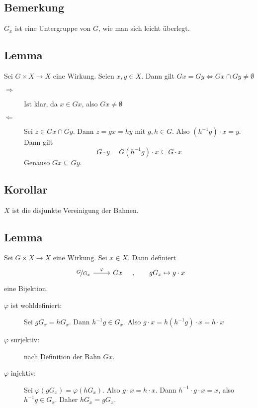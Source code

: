 \subsection[Bemerkung: $G_x$ ist eine Untergruppe von $G$]{Bemerkung} %
\label{sub:36}
$G_x$ ist eine Untergruppe von $G$, wie man sich leicht überlegt.

\subsection[Lemma über die Gleichheit von Bahnen]{Lemma} %
\label{sub:37}
Sei $G \times X \to X$ eine Wirkung. Seien $x,y \in X$. Dann gilt $Gx= Gy \Longleftrightarrow Gx \cap Gy \not= \emptyset$
\begin{description}
	\item[\glqq$\Rightarrow $\grqq] Ist klar, da $x \in Gx$, also $Gx \not= \emptyset$
	\item[\glqq$\Leftarrow$\grqq] Sei $z \in Gx \cap Gy$. Dann $z= gx= hy$ mit $g,h \in G$. Also $(h ^{-1} g) \cdot x = y$. Dann gilt
	\[
		G \cdot y = G (h ^{-1} g) \cdot x \subseteq G \cdot x
	\]
	Genauso $Gx \subseteq Gy$. \bewende
\end{description}

\subsection[Korollar: $X$ ist die disjunkte Vereinigung der Bahnen]{Korollar} %
\label{sub:38}
$X$ ist die disjunkte Vereinigung der Bahnen.

\subsection[Lemma: Bijektion $\nicefrac{G}{G_x} \to Gx$]{Lemma} %
\label{sub:39}
Sei $G \times X \to X$ eine Wirkung. Sei $x \in X$. Dann definiert 
\[
	\begin{tikzcd}
		\nicefrac{G}{G_x} \rar{\varphi} & Gx
	\end{tikzcd} \quad , \qquad  g G_x \mapsto g \cdot x
\]
eine Bijektion.
\begin{description}
	\item[$\varphi$ ist wohldefiniert:] Sei $gG_x = hG_x$. Dann $h ^{-1} g \in G_x$. Also $g \cdot x = h (h ^{-1} g) \cdot x = h \cdot x$
	\item[$\varphi$ surjektiv:] nach Definition der Bahn $Gx$.
	\item[$\varphi$ injektiv:] Sei $\varphi(gG_x) = \varphi(h G_x)$. Also $g \cdot x = h \cdot x$. Dann $h ^{-1} \cdot g \cdot x = x$, also $h ^{-1} g \in G_x$. Daher
	$hG_x= gG_x$. \bewende
\end{description}

